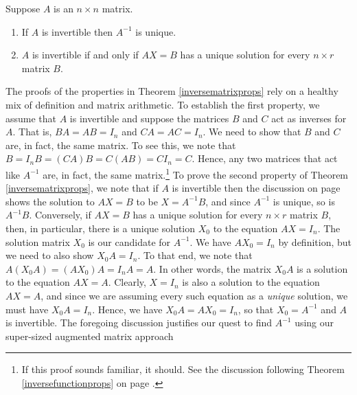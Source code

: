 \smallskip

\colorbox{ResultColor}{\bbm

\begin{thm}  \label{inversematrixprops}  Suppose $A$ is an $n \times n$ matrix. 


\vspace{-.1in} 

\begin{enumerate}

\item  If $A$ is invertible then $A^{-1}$ is unique.

\vspace{-.1in}

\item  $A$ is invertible if and only if $AX = B$ has a unique solution for every $n \times r$ matrix $B$.  

\end{enumerate}

\end{thm}

\ebm}

\smallskip

The proofs of the properties in Theorem \ref{inversematrixprops} rely on a healthy mix of definition and matrix arithmetic.  To establish the first property, we assume that $A$ is invertible and suppose the matrices $B$ and $C$ act as inverses for $A$.  That is, $BA = AB = I_{n}$ and $CA = AC = I_{n}$.  We need to show that $B$ and $C$ are, in fact, the same matrix.  To see this, we note that $B = I_{n}B = (CA)B = C(AB) = CI_{n} = C$. Hence, any two matrices that act like $A^{-1}$ are, in fact, the same matrix.\footnote{If this proof sounds familiar, it should. See the discussion following Theorem \ref{inversefunctionprops} on page \pageref{inversefunctionuniqueness}.}  To prove the second property of Theorem  \ref{inversematrixprops}, we note that if $A$ is invertible then the discussion on page \pageref{solvingmatrixeqn} shows the solution to $AX=B$ to be $X = A^{-1}B$, and since $A^{-1}$ is unique, so is $A^{-1}B$. Conversely, if $AX = B$ has a unique solution for every $n \times r$ matrix $B$, then, in particular, there is a unique solution $X_{0}$ to the equation $AX = I_{n}$.  The solution matrix $X_{0}$ is our candidate for $A^{-1}$. We have $AX_{0} = I_{n}$ by definition, but we need to also show $X_{0}A = I_{n}$.  To that end, we note that $A\left(X_{0}A\right) = \left(AX_{0}\right)A = I_{n}A = A$.  In other words, the matrix $X_{0}A$ is a solution to the equation $AX = A$.  Clearly, $X=I_{n}$ is also a solution to the equation $AX = A$, and since we are assuming every such equation as a \textit{unique} solution, we must have $X_{0}A = I_{n}$.  Hence, we have $X_{0}A = AX_{0} = I_{n}$, so that $X_{0} = A^{-1}$ and $A$ is invertible.  The foregoing discussion justifies our quest to find $A^{-1}$ using our super-sized augmented matrix approach
 
